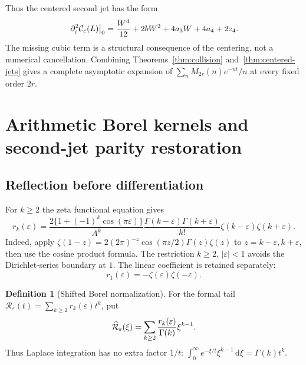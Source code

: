 \documentclass[11pt,a4paper]{article}
\numberwithin{equation}{section}
\theoremstyle{definition}\newtheorem{definition}[theorem]{Definition}
\theoremstyle{remark}\newtheorem{remark}[theorem]{Remark}
\newcommand{\dd}{\,\mathrm d}
\newcommand{\eps}{\varepsilon}
\newcommand{\B}{\widehat{\mathcal R}}
\begin{document}
Thus the centered second jet has the form
\[
 \left.\partial_\eps^2\CC_\eps(L)\right|_0
 =\frac{W^4}{12}+2bW^2+4a_3W+4a_4+2z_4.
\]
The missing cubic term is a structural consequence of the centering,
not a numerical cancellation. Combining Theorems~\ref{thm:collision}
and~\ref{thm:centered-jets} gives a complete asymptotic expansion of
$\sum_n M_{2r}(n)e^{-nt}/n$ at every fixed order $2r$.

\section{Arithmetic Borel kernels and second-jet parity restoration}
\label{sec:borel}

\subsection{Reflection before differentiation}
For $k\ge2$ the zeta functional equation gives
\begin{equation}\label{eq:reflected-r}
 r_k(\eps)=\frac{2\{1+(-1)^k\cos(\pi\eps)\}}{A^k}
 \frac{\Gamma(k-\eps)\Gamma(k+\eps)}{k!}
 \zeta(k-\eps)\zeta(k+\eps).
\end{equation}
Indeed, apply
$\zeta(1-z)=2(2\pi)^{-z}\cos(\pi z/2)\Gamma(z)\zeta(z)$
to $z=k-\eps,k+\eps$, then use the cosine product formula.
The restriction $k\ge2$, $|\eps|<1$ avoids the Dirichlet-series
boundary at $1$. The linear coefficient is retained separately:
\begin{equation}\label{eq:r1}
 r_1(\eps)=-\zeta(\eps)\zeta(-\eps).
\end{equation}

\begin{definition}[Shifted Borel normalization]
For the formal tail $\mathcal R_\eps(t)=\sum_{k\ge2}r_k(\eps)t^k$,
put
\begin{equation}\label{eq:borel-convention}
 \B_\eps(\xi)=\sum_{k\ge2}{r_k(\eps)\over\Gamma(k)}\xi^{k-1}.
\end{equation}
Thus Laplace integration has no extra factor $1/t$:
$\int_0^\infty e^{-\xi/t}\xi^{k-1}\dd\xi=\Gamma(k)t^k$.
\end{definition}
\end{document}
